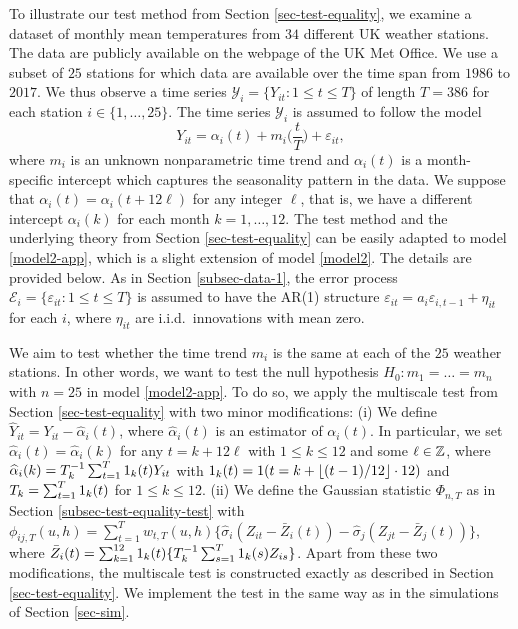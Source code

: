 To illustrate our test method from Section \ref{sec-test-equality}, we examine a dataset of monthly mean temperatures from $34$ different UK weather stations. The data are publicly available on the webpage of the UK Met Office. We use a subset of $25$ stations for which data are available over the time span from $1986$ to $2017$. We thus observe a time series $\mathcal{Y}_i = \{Y_{it}: 1 \le t \le T \}$ of length $T = 386$ for each station $i \in \{1,\ldots,25\}$. The time series $\mathcal{Y}_i$ is assumed to follow the model 
\begin{equation}\label{model2-app}
Y_{it} = \alpha_i(t) + m_i\Big(\frac{t}{T}\Big) + \varepsilon_{it}, 
\end{equation}
where $m_i$ is an unknown nonparametric time trend and $\alpha_i(t)$ is a month-specific intercept which captures the seasonality pattern in the data. We suppose that $\alpha_i(t) = \alpha_i(t + 12 \ell)$ for any integer $\ell$, that is, we have a different intercept $\alpha_i(k)$ for each month $k = 1,\ldots,12$. The test method and the underlying theory from Section \ref{sec-test-equality} can be easily adapted to model \eqref{model2-app}, which is a slight extension of model \eqref{model2}. The details are provided below. As in Section \ref{subsec-data-1}, the error process $\mathcal{E}_i = \{ \varepsilon_{it}: 1 \le t \le T \}$ is assumed to have the AR(1) structure $\varepsilon_{it} = a_i \varepsilon_{i,t-1} + \eta_{it}$ for each $i$, where $\eta_{it}$ are i.i.d.\ innovations with mean zero.  


We aim to test whether the time trend $m_i$ is the same at each of the $25$ weather stations. In other words, we want to test the null hypothesis $H_0: m_1 = \ldots = m_n$ with $n = 25$ in model \eqref{model2-app}. To do so, we apply the multiscale test from Section \ref{sec-test-equality} with two minor modifications: (i) We define $\widehat{Y}_{it} = Y_{it} - \widehat{\alpha}_i(t)$, where $\widehat{\alpha}_i(t)$ is an estimator of $\alpha_i(t)$. In particular, we set $\widehat{\alpha}_i(t) = \widehat{\alpha}_i(k)$ for any $t = k + 12 \ell$ with $1 \le k \le 12$ and some $\ell \in \mathbb{Z}$, where $\widehat{\alpha}_i(k) = T_k^{-1} \sum_{t = 1}^T 1_k(t) Y_{it}$ with $1_k(t) = 1(t = k + \lfloor (t-1)/12 \rfloor \cdot 12)$ and $T_k = \sum_{t=1}^T 1_k(t)$ for $1 \le k \le 12$. (ii) We define the Gaussian statistic $\Phi_{n,T}$ as in Section \ref{subsec-test-equality-test} with $\phi_{ij,T}(u,h) = \sum_{t=1}^T w_{t,T}(u,h) \{ \widehat{\sigma}_i (Z_{it} - \bar{Z}_i(t)) - \widehat{\sigma}_j (Z_{jt} - \bar{Z}_j(t))\}$, where $\bar{Z}_i(t) = \sum_{k=1}^{12} 1_k(t) \{ T_k^{-1} \sum_{s = 1}^T 1_k(s) Z_{is} \}$. Apart from these two modifications, the multiscale test is constructed exactly as described in Section \ref{sec-test-equality}. We implement the test in the same way as in the simulations of Section \ref{sec-sim}. 



